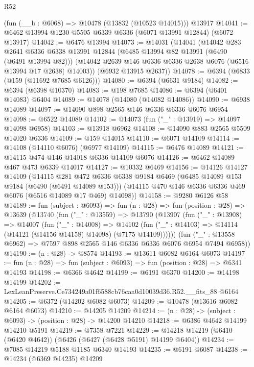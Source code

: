 \begin{lexlean}{R52}
\begin{coremodule}
    (fun (__b : @6068) => @10478 (@13832 (@10523 @14015)))
    @13917
@14041 := @6462 @13994 @1230 @5505 @6339 @6336 (@6071 @13991 @12844) (@6072 @13917)
@14042 := @6476 @13994
@14073 := @14031
    (@14041
      (@14042
        @283
        @2641
        @6336
        @6338
        @13991
        @12844
        (@6485 @13994 @82 @13991 (@6490 (@6491 @13994 @82)))
        (@14042 @2639 @146 @6336 @6336 @2638 @6076 (@6516 @13994 @17 @2638) @14003))
      (@6932 @13915 @2637))
@14078 := @6394 (@6833 (@159 (@11692 @7685 @6126)))
@14080 := @6394 (@6631 @9184)
@14082 := @6394 (@6398 @10370)
@14083 := @198 @7685
@14086 := @6394 (@6401 @14083) @6404
@14089 := @14078 (@14080 (@14082 @14086))
@14090 := @6938 @14089
@14097 := @14090 @898 @2565 @146 @6336 @6336 @6076 @6954
@14098 := @6522 @14089
@14102 := @14073 (fun ("_" : @13919) => @14097 @14098 @6958)
@14103 := @13918 @6962
@14108 := @14090 @883 @2565 @5509 @14020 @6336
@14109 := @159 @14015
@14110 := @6071 @14109
@14114 := @14108 (@14110 @6076) (@6977 @14109)
@14115 := @6476 @14089
@14121 := @14115 @474 @146 @14018 @6336 @14109 @6076
@14126 := @6462 @14089 @467 @473 @6339 @14017
@14127 := @10332 @6469
@14156 := @14126
    @14127
    @14109
    (@14115
      @281
      @472
      @6336
      @6338
      @9184
      @6469
      (@6485 @14089 @153 @9184 (@6490 (@6491 @14089 @153)))
      (@14115 @470 @146 @6336 @6336 @469 @6076 (@6516 @14089 @17 @469) @14098))
@14158 := @9280 @6126 @58
@14189 := fun (subject : @6093) =>
  fun (n : @28) =>
  fun (position : @28) =>
  @13639
    (@13740
      (fun ("_" : @13559) =>
      @13790
        (@13907
          (fun ("_" : @13908) =>
          @14007
            (fun ("_" : @14008) =>
            @14102 (fun ("_" : @14103) => @14114 (@14121 (@14156 @14158) @14098) (@7175 @14109))))))
      (fun ("_" : @13558 @6962) => @7597 @898 @2565 @146 @6336 @6336 @6076 @6954 @7494 @6958))
@14190 := (n : @28) -> @8574
@14193 := @13611 @6082 @6164 @6073
@14197 := fun (n : @28) => fun (subject : @6093) => fun (position : @28) => @6341 @14193
@14198 := @6366 @4642
@14199 := @6191 @6370
@14200 := @14198 @14199
@14202 := LexLeanPreserve.Ce734249a01f6588cb76caa0d10039d36.R52.__fits_88 @6164
@14205 := @6372 (@14202 @6082 @6073)
@14209 := @10478 (@13616 @6082 @6164 @6073)
@14210 := @14205 @14209
@14214 := (n : @28) -> (subject : @6093) -> (position : @28) -> @14200 @14210
@14218 := @6386 @4642 @14199 @14210 @5191
@14219 := @7358 @7221
@14229 := @14218 @14219 (@6410 (@6420 @4642)) (@6426 (@6427 (@6428 @5191) @14199 @6404))
@14234 := @7085 @14219 @5188 @1185 @6340 @14193
@14235 := @6191 @6087
@14238 := @14234 (@6369 @14235) @14209

\end{coremodule}
\end{lexlean}
